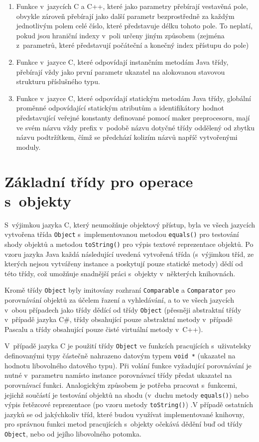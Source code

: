 \documentclass[czech,BP]{thesiskiv}
\begin{document}
\begin{enumerate}
\item{Funkce v~jazycích C a C++, které jako parametry přebírají vestavěná pole, obvykle zároveň přebírají jako další parametr bezprostředně za každým jednotlivým polem celé číslo, které představuje délku tohoto pole. To neplatí, pokud jsou hraniční indexy v~poli určeny jiným způsobem (zejména z~parametrů, které představují počáteční a konečný index přístupu do pole)}
\item{Funkce v~jazyce C, které odpovídají instančním metodám Java třídy, přebírají vždy jako první parametr ukazatel na alokovanou stavovou strukturu příslušného typu.}
\item{Funkce v~jazyce C, které odpovídají statickým metodám Java třídy, globální proměnné odpovídající statickým atributům a identifikátory hodnot představující veřejné konstanty definované pomocí maker preprocesoru, mají ve svém názvu vždy prefix v~podobě názvu dotyčné třídy oddělený od zbytku názvu podtržítkem, čímž se předchází kolizím názvů napříč vytvořenými moduly.}
\end{enumerate}

\section{Základní třídy pro operace s~objekty}
S~výjimkou jazyka C, který neumožňuje objektový přístup, byla ve všech jazycích vytvořena třída \texttt{Object} s~implementovanou metodou \texttt{equals()} pro testování shody objektů a metodou \texttt{toString()} pro výpis textové reprezentace objektů. Po vzoru jazyka Java každá následující uvedená vytvořená třída (s~výjimkou tříd, ze kterých nejsou vytvářeny instance a poskytují pouze statické metody) dědí od této třídy, což umožňuje snadnější práci s~objekty v~některých knihovnách.\par
Kromě třídy \texttt{Object} byly imitovány rozhraní \texttt{Comparable} a \texttt{Comparator} pro porovnávání objektů za účelem řazení a vyhledávání, a to ve všech jazycích v~obou případech jako třídy dědící od třídy \texttt{Object} (přesněji abstraktní třídy v~případě jazyka C\#, třídy obsahující pouze abstraktní metody v~případě Pascalu a třídy obsahující pouze čisté virtuální metody v~C++).\par
V~případě jazyka C je použití třídy \texttt{Object} ve funkcích pracujících s~uživatelsky definovanými typy částečně nahrazeno datovým typem \texttt{void *} (ukazatel na hodnotu libovolného datového typu). Při volání funkce vyžadující porovnávání je nutné v~parametru namísto instance porovnávací třídy předat ukazatel na porovnávací funkci. Analogickým způsobem je potřeba pracovat s~funkcemi, jejichž součástí je testování objektů na shodu (v~duchu metody \texttt{equals()}) nebo výpis řetězcové reprezentace (po vzoru metody \texttt{toString()}) .V případě ostatních jazyků se od jakýchkoliv tříd, které budou využívat implementované knihovny, pro správnou funkci metod pracujících s~objekty očekává dědění buď od třídy \texttt{Object}, nebo od jejího libovolného potomka.
\end{document}
